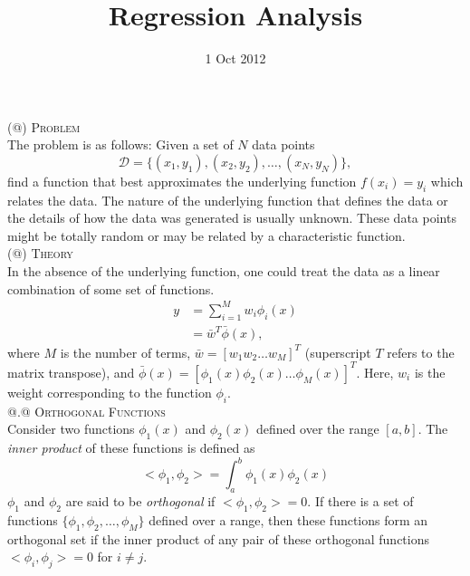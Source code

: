 \documentclass[a4paper,12pt]{article}
\title{Regression Analysis}
\author{}
\date{1 Oct 2012}
\makeatletter
\newcommand*{\rom}[1]{\expandafter\@slowromancap\romannumeral #1@}
\makeatother
\begin{document}
\maketitle

\noindent (\rom{1}) \textsc{Problem} \\
\hspace*{5mm} The problem is as follows: Given a set of $N$ data points \[\mathcal{D}=\{(x_1,y_1),(x_2,y_2),\ldots,(x_N,y_N)\},\] find a function that best approximates the underlying function $f(x_i) = y_i$ which relates the data. The nature of the underlying function that defines the data or the details of how the data was generated is usually unknown. These data points might be totally random or may be related by a characteristic function. \\

\noindent (\rom{2}) \textsc{Theory} \\
\hspace*{5mm} In the absence of the underlying function, one could treat the data as a linear combination of some set of functions.
\begin{align}
y &=  \sum_{i=1}^M w_i \phi_i(x) \\
  &=  \bar{w}^T \bar{\phi}(x), 
\end{align}
where $M$ is the number of terms, $\bar{w} = [w_1 w_2 \ldots w_M]^T$ (superscript $T$ refers to the matrix transpose), and $\bar{\phi}(x) = [\phi_1(x) \phi_2(x) \ldots \phi_M(x)]^T$. Here, $w_i$ is the weight corresponding to the function $\phi_i$. \\

\noindent \rom{2}.\rom{1} \textsc{Orthogonal Functions} \\
\hspace*{5mm} Consider two functions $\phi_1(x)$ and $\phi_2(x)$ defined over the range $[a,b]$. The \textit{inner product} of these functions is defined as
\[ <\phi_1,\phi_2> = \int_{a}^{b} \phi_1(x) \phi_2(x) \]
$\phi_1$ and $\phi_2$ are said to be \textit{orthogonal} if $<\phi_1,\phi_2> = 0$. If there is a set of functions $\{\phi_1,\phi_2,\ldots,\phi_M\}$ defined over a range, then these functions form an orthogonal set if the inner product of any pair of these orthogonal functions $<\phi_i,\phi_j> = 0$ for $i \neq j$. \\
\end{document}
